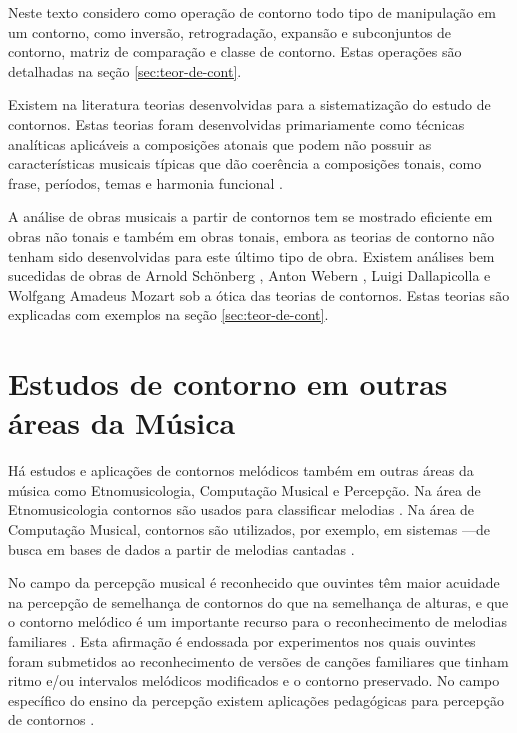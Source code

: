 Neste texto considero como operação de contorno todo tipo de
manipulação em um contorno, como inversão, retrogradação, expansão e
subconjuntos de contorno, matriz de comparação e classe de
contorno. Estas operações são detalhadas na seção
\ref{sec:teor-de-cont}.

Existem na literatura teorias desenvolvidas para a sistematização do
estudo de contornos. Estas teorias foram desenvolvidas primariamente
como técnicas analíticas aplicáveis a composições atonais que podem
não possuir as características musicais típicas que dão coerência a
composições tonais, como frase, períodos, temas e harmonia funcional
\cite[p. 1]{beard03:contour}.

A análise de obras musicais a partir de contornos tem se mostrado
eficiente em obras não tonais e também em obras tonais, embora as
teorias de contorno não tenham sido desenvolvidas para este último
tipo de obra. Existem análises bem sucedidas de obras de Arnold
Schönberg \cite{friedmann85:methodology}, Anton Webern
\cite{clifford95:contour}, Luigi Dallapicolla
\cite{marvin88:generalized} e Wolfgang Amadeus Mozart
\cite{beard03:contour} sob a ótica das teorias de contornos. Estas
teorias são explicadas com exemplos na seção \ref{sec:teor-de-cont}.

\section{Estudos de contorno em outras áreas da Música}
\label{sec:estudos-de-contorno}

Há estudos e aplicações de contornos melódicos também em outras áreas
da música como Etnomusicologia, Computação Musical e Percepção. Na
área de Etnomusicologia contornos são usados para classificar melodias
\cite{adams76:melodic}. Na área de Computação Musical, contornos são
utilizados, por exemplo, em sistemas ---de busca
em bases de dados a partir de melodias cantadas
\cite{ghias.ea95:query}.

No campo da percepção musical é reconhecido que ouvintes têm maior
acuidade na percepção de semelhança de contornos do que na semelhança
de alturas, e que o contorno melódico é um importante recurso para o
reconhecimento de melodias familiares \cite[p. 226,
136]{dowling.ea86:music}. Esta afirmação é endossada por experimentos
\cite{white60:recognition,dowling.ea71:contour} nos quais ouvintes
foram submetidos ao reconhecimento de versões de canções familiares
que tinham ritmo e/ou intervalos melódicos modificados e o contorno
preservado. No campo específico do ensino da percepção existem
aplicações pedagógicas para percepção de contornos
\cite{marvin88:generalized,friedmann90:ear}.

